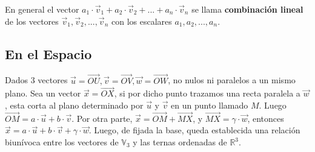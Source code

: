 \documentclass[11pt,a4paper]{article}
\begin{document}
\noindent En general el vector $a_1\cdot\overrightarrow{v}_1 + a_2\cdot\overrightarrow{v}_2 + ... + a_n\cdot\overrightarrow{v}_n$ se llama \textbf{combinaci\'on lineal} de los vectores $\overrightarrow{v}_1, \overrightarrow{v}_2, ..., \overrightarrow{v}_n$ con los escalares $a_1, a_2, ..., a_n$.

\subsection{En el Espacio}
\noindent Dados 3 vectores $\overrightarrow{u} = \overrightarrow{OU}, \overrightarrow{v} = \overrightarrow{OV}, \overrightarrow{w} = \overrightarrow{OW}$, no nulos ni paralelos a un mismo plano. Sea un vector $\overrightarrow{x} = \overrightarrow{OX}$, si por dicho punto trazamos una recta paralela a $\overrightarrow{w}$, esta corta al plano determinado por $\overrightarrow{u}$ y $\overrightarrow{v}$ en un punto llamado $M$. Luego $\overrightarrow{OM} = a \cdot \overrightarrow{u} + b \cdot \overrightarrow{v}$. Por otra parte, $\overrightarrow{x} = \overrightarrow{OM} + \overrightarrow{MX}$, y $\overrightarrow{MX} = \gamma \cdot \overrightarrow{w}$, entonces $\overrightarrow{x} = a\cdot \overrightarrow{u} + b \cdot \overrightarrow{v} + \gamma \cdot \overrightarrow{w}$. Luego, de fijada la base, queda establecida una relaci\'on biun\'ivoca entre los vectores de $\mathbb{V}_3$ y las ternas ordenadas de $\mathbb{R}^3$.
\end{document}
